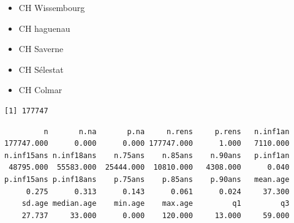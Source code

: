 \documentclass[]{article}
\newenvironment{Shaded}{\begin{snugshade}}{\end{snugshade}}
\newcommand{\KeywordTok}[1]{\textcolor[rgb]{0.13,0.29,0.53}{\textbf{{#1}}}}
\newcommand{\StringTok}[1]{\textcolor[rgb]{0.31,0.60,0.02}{{#1}}}
\newcommand{\CommentTok}[1]{\textcolor[rgb]{0.56,0.35,0.01}{\textit{{#1}}}}
\newcommand{\NormalTok}[1]{{#1}}
\begin{document}
\begin{itemize}
\itemsep1pt\parskip0pt
\item
  CH Wissembourg
\item
  CH haguenau
\item
  CH Saverne
\item
  CH Sélestat
\item
  CH Colmar
\end{itemize}

\begin{Shaded}
\end{Shaded}

\begin{verbatim}
[1] 177747
\end{verbatim}

\begin{Shaded}
\end{Shaded}

\begin{verbatim}
         n       n.na       p.na     n.rens     p.rens   n.inf1an 
177747.000      0.000      0.000 177747.000      1.000   7110.000 
n.inf15ans n.inf18ans    n.75ans    n.85ans    n.90ans   p.inf1an 
 48795.000  55583.000  25444.000  10810.000   4308.000      0.040 
p.inf15ans p.inf18ans    p.75ans    p.85ans    p.90ans   mean.age 
     0.275      0.313      0.143      0.061      0.024     37.300 
    sd.age median.age    min.age    max.age         q1         q3 
    27.737     33.000      0.000    120.000     13.000     59.000 
\end{verbatim}

\begin{Shaded}
\end{Shaded}
\end{document}
